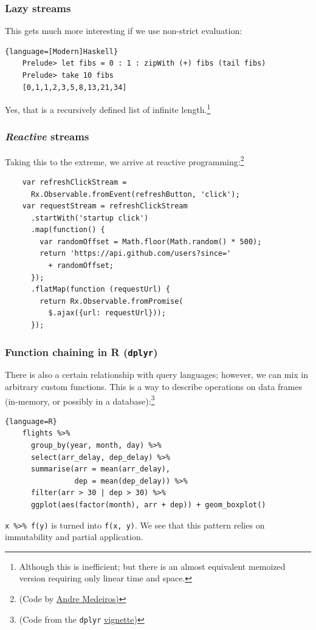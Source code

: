 \documentclass{beamer}
\begin{document}
\begin{frame}[containsverbatim]
  \frametitle{Lazy streams} 
  
  This gets much more interesting if we use non-strict evaluation:

  \begin{lstlisting}{language=[Modern]Haskell}
    Prelude> let fibs = 0 : 1 : zipWith (+) fibs (tail fibs)
    Prelude> take 10 fibs
    [0,1,1,2,3,5,8,13,21,34]
  \end{lstlisting}

  Yes, that is a recursively defined list of infinite length.\footnote{Although this is inefficient;
    but there is an almost equivalent memoized\\ version requiring only linear time and space.}
\end{frame}

\begin{frame}[containsverbatim]
  \frametitle{\textit{Reactive} streams} 

  Taking this to the extreme, we arrive at reactive programming:\footnote{(Code by
    \href{https://gist.github.com/staltz/868e7e9bc2a7b8c1f754}{%
      Andre Medeiros)}}

  \begin{lstlisting}
    var refreshClickStream = 
      Rx.Observable.fromEvent(refreshButton, 'click');
    var requestStream = refreshClickStream
      .startWith('startup click')
      .map(function() {
        var randomOffset = Math.floor(Math.random() * 500);
        return 'https://api.github.com/users?since=' 
          + randomOffset;
      });
      .flatMap(function (requestUrl) {
        return Rx.Observable.fromPromise(
          $.ajax({url: requestUrl}));
      });
  \end{lstlisting} %

  
\end{frame}

\begin{frame}[containsverbatim]
  \frametitle{Function chaining in R (\texttt{dplyr})} 

  There is also a certain relationship with query languages; however, we can mix in arbitrary custom
  functions. This is a way to describe operations on data frames (in-memory, or possibly in a
  database):\footnote{(Code from the \texttt{dplyr} 
    \href{https://cran.r-project.org/web/packages/dplyr/vignettes/introduction.html}{vignette})}

  \begin{lstlisting}{language=R}
    flights %>%
      group_by(year, month, day) %>%
      select(arr_delay, dep_delay) %>%
      summarise(arr = mean(arr_delay), 
                dep = mean(dep_delay)) %>%
      filter(arr > 30 | dep > 30) %>% 
      ggplot(aes(factor(month), arr + dep)) + geom_boxplot()
  \end{lstlisting}

  \lstinline|x %>% f(y)| is turned into \lstinline|f(x, y)|. We see that this pattern relies on
               immutability and partial application.
\end{frame}
\end{document}
